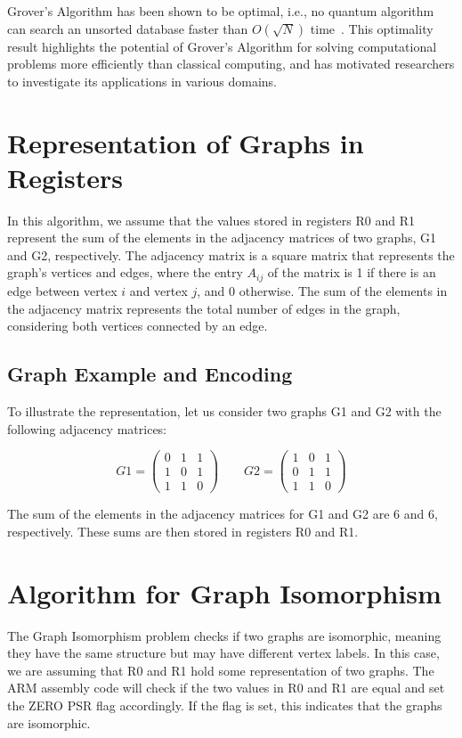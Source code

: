 Grover's Algorithm has been shown to be optimal, i.e., no quantum algorithm can search an unsorted database faster than $O(\sqrt{N})$ time~\cite{optimality}. This optimality result highlights the potential of Grover's Algorithm for solving computational problems more efficiently than classical computing, and has motivated researchers to investigate its applications in various domains.

\section{Representation of Graphs in Registers}

In this algorithm, we assume that the values stored in registers R0 and R1 represent the sum of the elements in the adjacency matrices of two graphs, G1 and G2, respectively. The adjacency matrix is a square matrix that represents the graph's vertices and edges, where the entry $A_{ij}$ of the matrix is 1 if there is an edge between vertex $i$ and vertex $j$, and 0 otherwise. The sum of the elements in the adjacency matrix represents the total number of edges in the graph, considering both vertices connected by an edge.

\subsection{Graph Example and Encoding}

To illustrate the representation, let us consider two graphs G1 and G2 with the following adjacency matrices:

\[
G1 = 
\begin{pmatrix}
0 & 1 & 1 \\
1 & 0 & 1 \\
1 & 1 & 0
\end{pmatrix}
\qquad
G2 = 
\begin{pmatrix}
1 & 0 & 1 \\
0 & 1 & 1 \\
1 & 1 & 0
\end{pmatrix}
\]

The sum of the elements in the adjacency matrices for G1 and G2 are 6 and 6, respectively. These sums are then stored in registers R0 and R1.

\section{Algorithm for Graph Isomorphism}

The Graph Isomorphism problem checks if two graphs are isomorphic, meaning they have the same structure but may have different vertex labels. In this case, we are assuming that R0 and R1 hold some representation of two graphs. The ARM assembly code will check if the two values in R0 and R1 are equal and set the ZERO PSR flag accordingly. If the flag is set, this indicates that the graphs are isomorphic.

